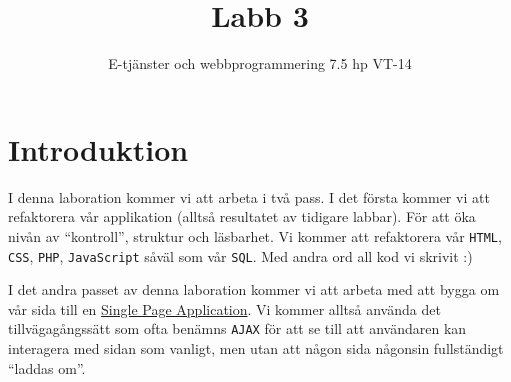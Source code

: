 \documentclass[12pt]{article}
\date{}
\title{ Labb 3 }
\author{ E-tjänster och webbprogrammering 7.5 hp VT-14 }
\begin{document}
\maketitle
\vspace{-2em}



\section{Introduktion}
I denna laboration kommer vi att arbeta i två pass. I det första kommer vi att refaktorera vår applikation (alltså resultatet av tidigare labbar). För att öka nivån av ``kontroll'', struktur och läsbarhet. Vi kommer att refaktorera vår \texttt{HTML}, \texttt{CSS}, \texttt{PHP}, \texttt{JavaScript} såväl som vår \texttt{SQL}. Med andra ord all kod vi skrivit :)

I det andra passet av denna laboration kommer vi att arbeta med att bygga om vår sida till en \href{http://en.wikipedia.org/wiki/Single-page_application}{Single Page Application}. Vi kommer alltså använda det tillvägagångssätt som ofta benämns \texttt{AJAX} för att se till att användaren kan interagera med sidan som vanligt, men utan att någon sida någonsin fullständigt ``laddas om''.

\pagebreak
\end{document}
